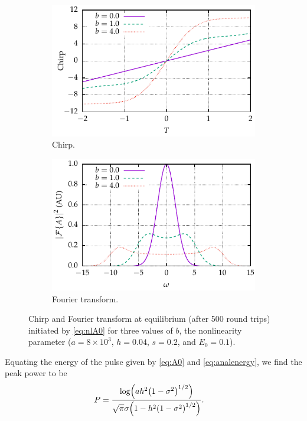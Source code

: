\documentclass[9pt,twocolumn,twoside]{osajnl}
\let\originalleft\left
\let\originalright\right
\renewcommand{\left}{\mathopen{}\mathclose\bgroup\originalleft}
\renewcommand{\right}{\aftergroup\egroup\originalright}
\begin{document}
\begin{figure}[tbp]
	\centering
	\begin{subfigure}{\columnwidth}
		\centering
		\includegraphics{Figures/Chirp}
		\caption{Chirp.}
		\label{fig:chirp}
	\end{subfigure} \hfill
	\begin{subfigure}{\columnwidth}
		\centering
		\includegraphics{Figures/FT}
		\caption{Fourier transform.}
		\label{fig:ft}
	\end{subfigure}
	\caption{Chirp and Fourier transform at equilibrium (after 500 round trips) initiated by \eqref{eq:nlA0} for three values of $b$, the nonlinearity parameter ($a = 8 \times 10^3$, $h = 0.04$, $s = 0.2$, and $E_0 = 0.1$).}
	\label{fig:chirpft}
\end{figure}


Equating the energy of the pulse given by \eqref{eq:A0} and \eqref{eq:analenergy}, we find the peak power to be
\begin{align}
	P &= \frac{\log \left( a h^2 \left( 1 - \sigma^2 \right)^{1/2} \right)}{\sqrt{\pi} \sigma \left( 1 - h^2 \left( 1 - \sigma^2 \right)^{1/2} \right)}.
	\label{eq:analpower}
\end{align}
\end{document}
